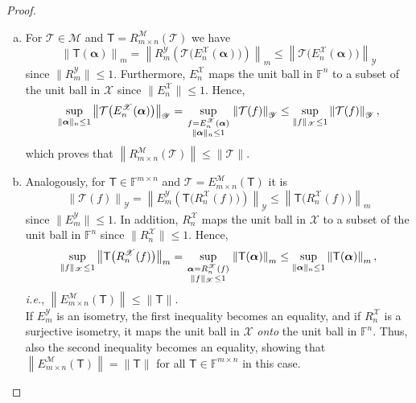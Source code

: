 \documentclass[a4paper]{paper}
\newcommand{\Spc}[1]{\mathscr{#1}}
\newcommand{\Field}{\mathbb{F}}
\newcommand{\Op}[1]{\mathcal{#1}}
\newcommand{\DiscOp}[1]{\mathsf{#1}}
\newcommand*{\EXT}[2]{\ensuremath{E_{#1}^{#2}}}
\newcommand*{\REST}[2]{\ensuremath{R_{#1}^{#2}}}
\newcommand*{\RnX}{\ensuremath{\REST{n}{\Spc{X}}}}
\newcommand*{\RmY}{\ensuremath{\REST{m}{\Spc{Y}}}}
\newcommand*{\EnX}{\ensuremath{\EXT{n}{\Spc{X}}}}
\newcommand*{\EmY}{\ensuremath{\EXT{m}{\Spc{Y}}}}
\newcommand*{\STACK}[2]{\genfrac{}{}{0pt}{1}{#1}{#2}}
\newcommand{\ie}{\textsl{i.e.}\xspace}
\newcommand{\valpha}{\boldsymbol{\alpha}}
\newcommand*{\NORMLR}[1]{\ensuremath{\left\lVert #1 \right\rVert}}
\newcommand*{\NORM}[1]{\ensuremath{\lVert #1 \rVert}}
\begin{document}
\begin{proof}
 \begin{enumerate}[(a)]
  \item For $\Op{T} \in \Spc{M}$ and $\DiscOp{T} = \REST{m\times n}{\Spc{M}}(\Op{T})$ we have
  \begin{equation*}
   \NORMLR{\DiscOp{T}(\valpha)}_m = \NORMLR{\RmY \left( \Op{T}\big( \EnX(\valpha) \big) \right)}_m
   \leq \NORMLR{\Op{T}\big( \EnX(\valpha) \big)}_{\Spc{Y}}
  \end{equation*}
  since $\NORM{\RmY} \leq 1$. Furthermore, $\EnX$ maps the unit ball in $\Field^n$ to a subset of the unit ball in
  $\Spc{X}$ since $\NORM{\EnX} \leq 1$. Hence,
  \begin{equation*}
   \sup_{\NORM{\valpha}_n \leq 1} \NORMLR{\Op{T}\big( \EnX(\valpha) \big)}_{\Spc{Y}}
   = \sup_{\STACK{f=\EnX(\valpha)}{\NORM{\valpha}_n \leq 1}} \NORMLR{\Op{T}(f)}_{\Spc{Y}}
   \leq \sup_{\NORM{f}_{\Spc{X}} \leq 1} \NORMLR{\Op{T}(f)}_{\Spc{Y}},
  \end{equation*}
  which proves that $\NORMLR{R_{m\times n}^{\Spc{M}}(\Op{T})} \leq \NORM{\Op{T}}$.

  \item Analogously, for $\DiscOp{T} \in \Field^{m\times n}$ and $\Op{T} = \EXT{m\times n}{\Spc{M}}(\DiscOp{T})$ it is
  \begin{equation*}
   \NORMLR{\Op{T}(f)}_{\Spc{Y}} = \NORMLR{\EmY \left( \DiscOp{T}\big( \RnX(f) \big) \right)}_{\Spc{Y}}
   \leq \NORMLR{\DiscOp{T}\big( \RnX(f) \big)}_m
  \end{equation*}
  since $\NORM{\EmY} \leq 1$. In addition, $\RnX$ maps the unit ball in $\Spc{X}$ to a subset of the unit 
  ball in $\Field^n$ since $\NORM{\RnX} \leq 1$. Hence,
  \begin{equation*}
   \sup_{\NORM{f}_{\Spc{X}} \leq 1} \NORMLR{\DiscOp{T}\big( \RnX(f) \big)}_m
   = \sup_{\STACK{\valpha=\RnX(f)}{\NORM{f}_{\Spc{X}} \leq 1}} \NORMLR{\DiscOp{T}(\valpha)}_m
   \leq \sup_{\NORM{\valpha}_n \leq 1} \NORMLR{\DiscOp{T}(\valpha)}_m,
  \end{equation*}
  \ie, $\NORMLR{E_{m\times n}^{\Spc{M}}(\DiscOp{T})} \leq \NORM{\DiscOp{T}}$.\\[1em]
  If $\EmY$ is an isometry, the first inequality becomes an equality, and if $\RnX$ is a surjective isometry, it maps
  the unit ball in $\Spc{X}$ \emph{onto} the unit ball in $\Field^n$. Thus, also the second inequality becomes an 
  equality, showing that $\NORMLR{E_{m\times n}^{\Spc{M}}(\DiscOp{T})} = \NORM{\DiscOp{T}}$ for all 
  $\DiscOp{T} \in \Field^{m\times n}$ in this case.
 \end{enumerate}
\end{proof}
\end{document}
